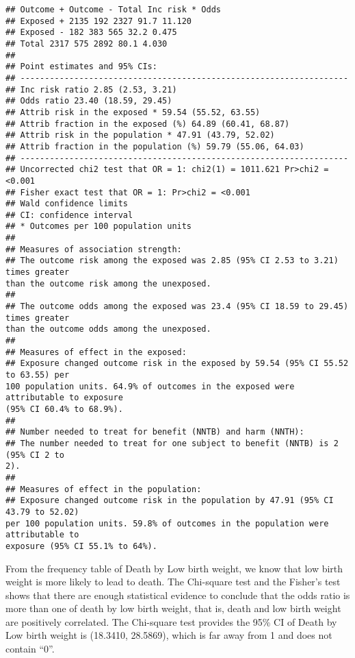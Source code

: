 \documentclass[
]{article}
\begin{document}
\begin{verbatim}
## Outcome + Outcome - Total Inc risk * Odds
## Exposed + 2135 192 2327 91.7 11.120
## Exposed - 182 383 565 32.2 0.475
## Total 2317 575 2892 80.1 4.030
##
## Point estimates and 95% CIs:
## -------------------------------------------------------------------
## Inc risk ratio 2.85 (2.53, 3.21)
## Odds ratio 23.40 (18.59, 29.45)
## Attrib risk in the exposed * 59.54 (55.52, 63.55)
## Attrib fraction in the exposed (%) 64.89 (60.41, 68.87)
## Attrib risk in the population * 47.91 (43.79, 52.02)
## Attrib fraction in the population (%) 59.79 (55.06, 64.03)
## -------------------------------------------------------------------
## Uncorrected chi2 test that OR = 1: chi2(1) = 1011.621 Pr>chi2 = <0.001
## Fisher exact test that OR = 1: Pr>chi2 = <0.001
## Wald confidence limits
## CI: confidence interval
## * Outcomes per 100 population units
##
## Measures of association strength:
## The outcome risk among the exposed was 2.85 (95% CI 2.53 to 3.21) times greater
than the outcome risk among the unexposed.
##
## The outcome odds among the exposed was 23.4 (95% CI 18.59 to 29.45) times greater
than the outcome odds among the unexposed.
##
## Measures of effect in the exposed:
## Exposure changed outcome risk in the exposed by 59.54 (95% CI 55.52 to 63.55) per
100 population units. 64.9% of outcomes in the exposed were attributable to exposure
(95% CI 60.4% to 68.9%).
##
## Number needed to treat for benefit (NNTB) and harm (NNTH):
## The number needed to treat for one subject to benefit (NNTB) is 2 (95% CI 2 to
2).
##
## Measures of effect in the population:
## Exposure changed outcome risk in the population by 47.91 (95% CI 43.79 to 52.02)
per 100 population units. 59.8% of outcomes in the population were attributable to
exposure (95% CI 55.1% to 64%).
\end{verbatim}

From the frequency table of Death by Low birth weight, we know that low
birth weight is more likely to lead to death. The Chi-square test and
the Fisher's test shows that there are enough statistical evidence to
conclude that the odds ratio is more than one of death by low birth
weight, that is, death and low birth weight are positively correlated.
The Chi-square test provides the 95\% CI of Death by Low birth weight is
(18.3410, 28.5869), which is far away from 1 and does not contain ``0''.
\end{document}
